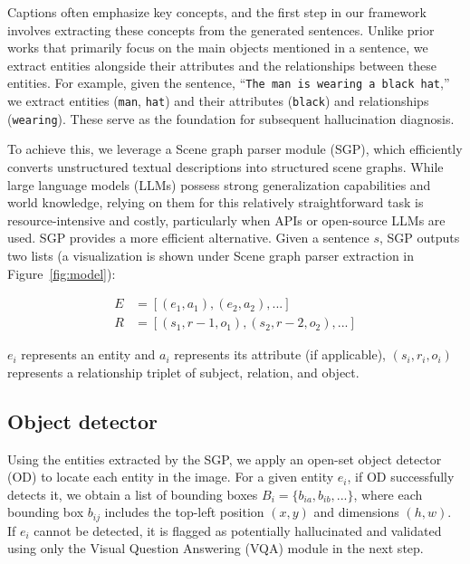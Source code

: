
Captions often emphasize key concepts, and the first step in our framework involves extracting these concepts from the generated sentences. Unlike prior works that primarily focus on the main objects mentioned in a sentence, we extract entities alongside their attributes and the relationships between these entities. For example, given the sentence, “\texttt{The man is wearing a black hat},” we extract entities (\texttt{man}, \texttt{hat}) and their attributes (\texttt{black}) and relationships (\texttt{wearing}). These serve as the foundation for subsequent hallucination diagnosis.

To achieve this, we leverage a Scene graph parser module (SGP), which efficiently converts unstructured textual descriptions into structured scene graphs. While large language models (LLMs) possess strong generalization capabilities and world knowledge, relying on them for this relatively straightforward task is resource-intensive and costly, particularly when APIs or open-source LLMs are used. SGP provides a more efficient alternative. Given a sentence $s$, SGP outputs two lists (a visualization is shown under Scene graph parser extraction in Figure~\ref{fig:model}):

\begin{align}
    E &= [ (e_1,a_1), (e_2,a_2), ... ] \\
    R &= [ (s_1,r-1,o_1), (s_2,r-2,o_2), ... ]
\end{align}

\noindent $e_i$ represents an entity and $a_i$ represents its attribute (if applicable), $(s_i,r_i,o_i)$ represents a relationship triplet of subject, relation, and object.

\subsection{Object detector}
\label{sec:method_2}

Using the entities extracted by the SGP, we apply an open-set object detector (OD) to locate each entity in the image. For a given entity $e_i$, if OD successfully detects it, we obtain a list of bounding boxes $B_i = \{b_{ia}, b_{ib}, ... \} $, where each bounding box $b_{ij}$  includes the top-left position $(x, y)$ and dimensions $(h, w)$. If $e_i$ cannot be detected, it is flagged as potentially hallucinated and validated using only the Visual Question Answering (VQA) module in the next step.

